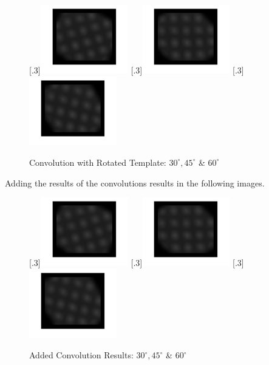 \documentclass[a4paper]{article}
\begin{document}
	\begin{figure}[H]
		\centering
		[.3\linewidth]{\includegraphics[height=3cm]{Results/Q3/a/qaConv2-30.jpg}}%
		[.3\linewidth]{\includegraphics[height=3cm]{Results/Q3/a/qaConv2-45.jpg}}%
		[.3\linewidth]{\includegraphics[height=3cm]{Results/Q3/a/qaConv2-60.jpg}}%
		\caption{Convolution with Rotated Template: $30^\circ, 45^\circ$ \& $60^\circ$}
		\label{fig:}
	\end{figure}
	\par Adding the results of the convolutions results in the following
	images.
	\begin{figure}[H]
		\centering
		[.3\linewidth]{\includegraphics[height=3cm]{Results/Q3/a/qaAddedConv30.jpg}}%
		[.3\linewidth]{\includegraphics[height=3cm]{Results/Q3/a/qaAddedConv45.jpg}}%
		[.3\linewidth]{\includegraphics[height=3cm]{Results/Q3/a/qaAddedConv60.jpg}}%
		\caption{Added Convolution Results: $30^\circ, 45^\circ$ \& $60^\circ$}
		\label{fig:}
	\end{figure}
\end{document}
